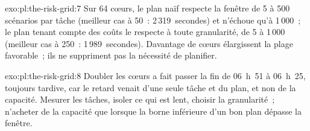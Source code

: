 \begin{solution}{exo:pl:the-risk-grid:7}
Sur 64 cœurs, le plan naïf respecte la fenêtre de 5 à 500 scénarios par tâche (meilleur cas à 50~: 2\,319~secondes) et n'échoue qu'à 1\,000~; le
plan tenant compte des coûts le respecte à toute granularité, de 5 à 1\,000 (meilleur cas à 250~: 1\,989~secondes). Davantage de cœurs élargissent la plage favorable~; ils ne suppriment pas la nécessité de planifier.
\end{solution}

\begin{solution}{exo:pl:the-risk-grid:8}
Doubler les cœurs a fait passer la fin de 06~h~51 à 06~h~25, toujours tardive, car le retard venait d'une seule tâche et du plan, et non de la capacité.
Mesurer les tâches, isoler ce qui est lent, choisir la granularité~; n'acheter de la capacité que lorsque la borne inférieure d'un bon plan dépasse la fenêtre.
\end{solution}

